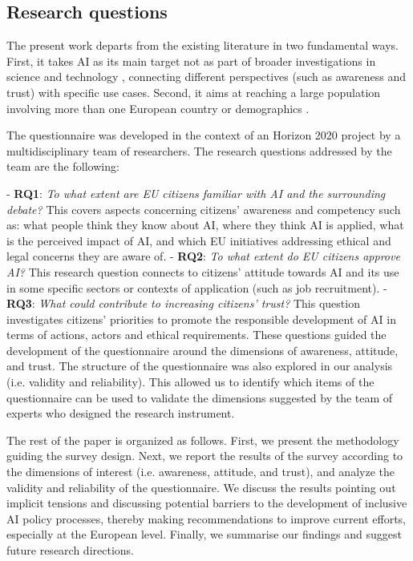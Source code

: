 \documentclass{article}
\begin{document}
\subsection{Research questions}

The present work departs from the existing literature in two fundamental ways. First, it takes AI as its main target not as part of broader investigations in science and technology \cite{european2021special}, connecting different perspectives (such as awareness and trust) with specific use cases. Second, it aims at reaching a large population involving more than one European country or demographics \cite{kieslich2022artificial, sartori2022, kerr2020expectations}. 

The questionnaire was developed in the context of 
an Horizon 2020 project by a multidisciplinary team of researchers. The research questions addressed by the team are the following:

-  \textbf{RQ1}: \emph{To what extent are EU citizens familiar with AI and the surrounding debate?} This covers aspects concerning citizens' awareness and competency such as: what people think they know about AI, where they think AI is applied, what is the perceived impact of AI, and which EU initiatives addressing ethical and legal concerns they are aware of.
-  \textbf{RQ2}: \emph{To what extent do EU citizens approve AI?} This research question connects to citizens' attitude towards AI and its use in some specific sectors or contexts of application (such as job recruitment).
-  \textbf{RQ3}: \emph{What could contribute to increasing citizens' trust?} This question investigates citizens' priorities to promote the responsible development of AI in terms of actions, actors and ethical requirements.
These questions guided the development of the questionnaire around the dimensions of awareness, attitude, and trust. The structure of the questionnaire was also explored in our analysis (i.e. validity and reliability). This allowed us to identify which items of the questionnaire can be used to validate the dimensions suggested by the team of experts who designed the research instrument.

The rest of the paper is organized as follows. First, we present the methodology guiding the survey design. Next, we report the results of the survey according to the dimensions of interest (i.e. awareness, attitude, and trust), and analyze the validity and reliability of the questionnaire. We discuss the results pointing out implicit tensions and discussing potential barriers to the development of inclusive AI policy processes, thereby making recommendations to improve current efforts, especially at the European level. Finally, we summarise our findings and suggest future research directions.
\end{document}
